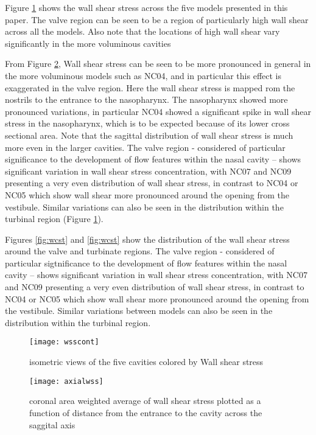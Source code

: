 Figure \ref{fig:wcont} shows the wall shear stress across the five models presented in this paper. The valve region can be seen to be a region of particularly high wall shear across all the models. Also note that the locations of high wall shear vary significantly in the more voluminous cavities


From Figure \ref{fig:wax}, Wall shear stress can be seen to be more pronounced in general in the more voluminous models such as NC04, and in particular this effect is exaggerated in the valve region. Here the wall shear stress is mapped rom the nostrils to the entrance to the nasopharynx. The nasopharynx showed more pronounced variations, in particular NC04 showed a significant spike in wall shear stress in the nasopharynx, which is to be expected because of its lower cross sectional area. Note that the sagittal distribution of wall shear stress is much more even in the larger cavities.  The valve region - considered of particular significance to the development of flow features within the nasal cavity \cite{Lindemann2008} – shows significant variation in wall shear stress concentration, with NC07 and NC09 presenting a very even distribution of wall shear stress, in contrast to NC04 or NC05 which show wall shear more pronounced around the opening from the vestibule. Similar variations can also be seen in the distribution within the turbinal region (Figure \ref{fig:wcont}). 

Figures \ref{fig:wcst} and \ref{fig:wcst} show the distribution of the wall shear stress around the valve and turbinate regions. The valve region - considered of particular sigtnificance to the development of flow features within the nasal cavity \cite{Lindemann2008} – shows significant variation in wall shear stress concentration, with NC07 and NC09 presenting a very even distribution of wall shear stress, in contrast to NC04 or NC05 which show wall shear more pronounced around the opening from the vestibule. Similar variations between models can also be seen in the distribution within the turbinal region. 

\begin{figure} 
  \texttt{[image: wsscont]}
  \caption{isometric views of the five cavities colored by Wall shear stress}
    \label{fig:wcont}
\end{figure}

\begin{figure} 
  \texttt{[image: axialwss]}
  \caption{coronal area weighted average of wall shear stress plotted as a function of distance from the entrance to the cavity across the saggital axis}
  \label{fig:wax}
\end{figure}

